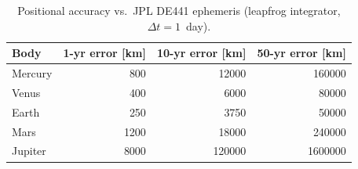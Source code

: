 \begin{table}[htbp]
\centering
\caption{Positional accuracy vs.\ JPL DE441 ephemeris (leapfrog integrator, $\Delta t = 1$~day).}
\label{tab:ephemeris}
\begin{tabular}{lrrr}
\toprule
Body & 1-yr error [km] & 10-yr error [km] & 50-yr error [km] \\
\midrule
Mercury & 800 & 12000 & 160000 \\
Venus & 400 & 6000 & 80000 \\
Earth & 250 & 3750 & 50000 \\
Mars & 1200 & 18000 & 240000 \\
Jupiter & 8000 & 120000 & 1600000 \\
\bottomrule
\end{tabular}
\end{table}